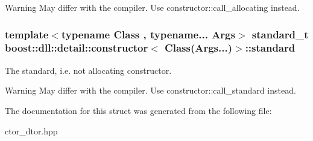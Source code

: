 \begin{DoxyWarning}{Warning}
May differ with the compiler. Use constructor\+::call\+\_\+allocating instead. 
\end{DoxyWarning}
\subsubsection[{\texorpdfstring{standard}{standard}}]{\setlength{\rightskip}{0pt plus 5cm}template$<$typename Class , typename... Args$>$ standard\+\_\+t {\bf boost\+::dll\+::detail\+::constructor}$<$ Class(Args...)$>$\+::standard}\hypertarget{a00064_a6cbccda8c81959e8e3bba7da28cada5d}{}\label{a00064_a6cbccda8c81959e8e3bba7da28cada5d}


The standard, i.\+e. not allocating constructor. 

\begin{DoxyWarning}{Warning}
May differ with the compiler. Use constructor\+::call\+\_\+standard instead. 
\end{DoxyWarning}


The documentation for this struct was generated from the following file\+:\begin{DoxyCompactItemize}
\item 
ctor\+\_\+dtor.\+hpp\end{DoxyCompactItemize}
